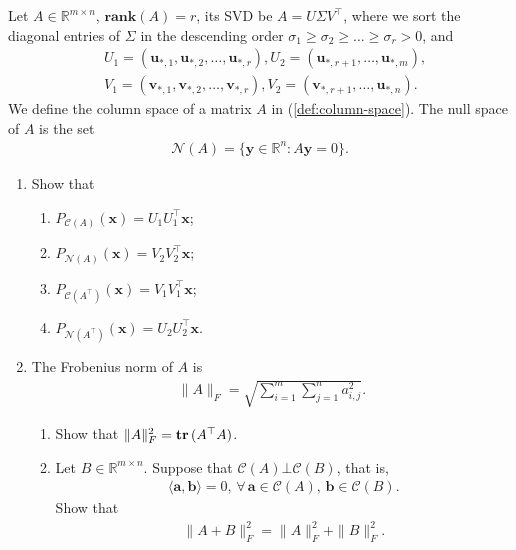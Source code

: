 \documentclass[11pt,letter,notitlepage]{article}
\DeclareMathOperator*{\tr}{\bf tr\,}
\newcommand{\rank}[1]{ \textbf{rank}  (#1)  }
\begin{document}
\begin{exercise}
    Let $A\in\mathbb{R}^{m\times n}$, $\rank{A}=r$, its SVD be $A=U\Sigma V^{\top}$, where we sort the diagonal entries of $\Sigma$ in the descending order $\sigma_1\geq\sigma_2\geq\ldots\geq\sigma_r>0$, and
    \begin{align*}
         & U_1=(\mathbf{u}_{*,1},\mathbf{u}_{*,2},\ldots,\mathbf{u}_{*,r}), U_2=(\mathbf{u}_{*,r+1},\ldots,\mathbf{u}_{*,m}), \\
         & V_1=(\mathbf{v}_{*,1},\mathbf{v}_{*,2},\ldots,\mathbf{v}_{*,r}), V_2=(\mathbf{v}_{*,r+1},\ldots,\mathbf{u}_{*,n}).
    \end{align*}
    We define the column space of a matrix $A$ in (\ref{def:column-space}).
    The null space of $A$ is the set
    \begin{align}\label{def:column-space}
        \mathcal{N}(A)=\{\mathbf{y}\in\mathbb{R}^n: A\mathbf{y}=0\}.
    \end{align}

    \begin{enumerate}
        \item Show that
              \begin{enumerate}
                  \item $P_{\mathcal{C}(A)}(\mathbf{x})=U_1U_1^{\top}\mathbf{x}$;
                  \item $P_{\mathcal{N}(A)}(\mathbf{x})=V_2V_2^{\top}\mathbf{x}$;
                  \item $P_{\mathcal{C}(A^{\top})}(\mathbf{x})=V_1V_1^{\top}\mathbf{x}$;
                  \item $P_{\mathcal{N}(A^{\top})}(\mathbf{x})=U_2U_2^{\top}\mathbf{x}$.
              \end{enumerate}

        \item The Frobenius norm of $A$ is
              \begin{align*}
                  \|A\|_F=\sqrt{\sum_{i=1}^m\sum_{j=1}^na_{i,j}^2}.
              \end{align*}
              \begin{enumerate}
                  \item Show that $\|A\|_F^2=\tr(A^{\top}A)$.

                  \item Let $B\in\mathbb{R}^{m\times n}$. Suppose that $\mathcal{C}(A)\bot\mathcal{C}(B)$, that is,
                        \begin{align*}
                            \langle\mathbf{a},\mathbf{b}\rangle=0,\,\forall\,\mathbf{a}\in\mathcal{C}(A),\,\mathbf{b}\in\mathcal{C}(B).
                        \end{align*}
                        Show that
                        \begin{align*}
                            \|A+B\|_F^2=\|A\|_F^2+\|B\|_F^2.
                        \end{align*}
              \end{enumerate}


\end{enumerate}
\end{exercise}
\end{document}
